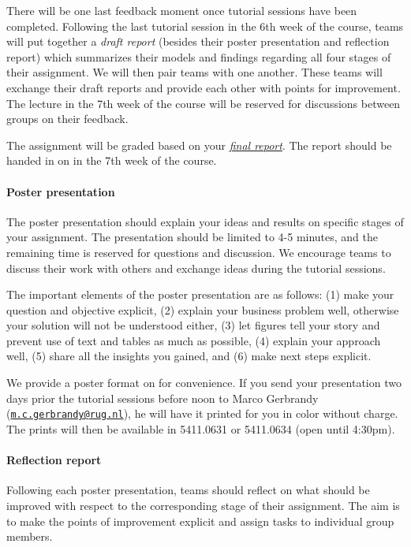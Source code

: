 \documentclass{article}
\begin{document}
There will be one last feedback moment once tutorial sessions have been completed. Following the last tutorial session in the 6th week of the course, teams will put together a \textit{draft report} (besides their poster presentation and reflection report) which summarizes their models and findings regarding all four stages of their assignment. We will then pair teams with one another. These teams will exchange their draft reports and provide each other with points for improvement. The lecture in the 7th week of the course will be reserved for discussions between groups on their feedback. 

The assignment will be graded based on your \hyperref[par:final]{\textit{final report}}. The report should be handed in on \nestor in the 7th week of the course.

\paragraph{Poster presentation}
\label{par:presentation}

The poster presentation should explain your ideas and results on specific stages of your assignment. The presentation should be limited to 4-5 minutes, and the remaining time is reserved for questions and discussion. We encourage teams to discuss their work with others and exchange ideas during the tutorial sessions. 

The important elements of the poster presentation are as follows: (1) make your question and objective explicit, (2) explain your business problem well, otherwise your solution will not be understood either, (3) let figures tell your story and prevent use of text and tables as much as possible, (4) explain your approach well, (5) share all the insights you gained, and (6) make next steps explicit.

We provide a poster format on \nestor for convenience. If you send your presentation two days prior the tutorial sessions before noon to Marco Gerbrandy (\href{mailto:m.c.gerbrandy@rug.nl}{\texttt{m.c.gerbrandy@rug.nl}}), he will have it printed for you in color without charge. The prints will then be available in 5411.0631 or 5411.0634 (open until 4:30pm).

\paragraph{Reflection report}
\label{par:reflection}

Following each poster presentation, teams should reflect on what should be improved with respect to the corresponding stage of their assignment. The aim is to make the points of improvement explicit and assign tasks to individual group members. 
\end{document}
